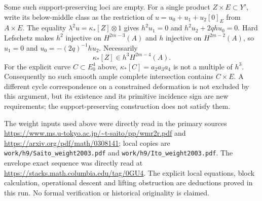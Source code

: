 Some such support-preserving loci are empty. For a single product
$Z\times E\subset Y'$, write its below-middle class as the
restriction of $u=u_0+u_1+u_2[0]_E$ from $A\times E$.
The equality $\lambda^2u=\kappa_*[Z]\otimes1$ gives
$h^2u_1=0$ and $h^2u_2+2qh u_0=0$. Hard Lefschetz makes
$h^2$ injective on $H^{2m-3}(A)$ and $h$ injective on
$H^{2m-2}(A)$, so $u_1=0$ and
$u_0=-(2q)^{-1}hu_2$. Necessarily
\[
                     \kappa_*[Z]\in h^3H^{2m-4}(A).
\]
For the explicit curve $C\subset E_0^4$ above,
$\kappa_*[C]=a_2a_3a_4$ is not a multiple of $h^3$.
Consequently no such smooth ample complete intersection contains
$C\times E$. A different cycle correspondence on a constrained
deformation is not excluded by this argument, but its existence
and its primitive incidence sign are new requirements; the
support-preserving construction does not satisfy them.

The weight inputs used above were directly read in the primary
sources
\url{https://www.ms.u-tokyo.ac.jp/~t-saito/pp/wmr2r.pdf} and
\url{https://arxiv.org/pdf/math/0308141}; local copies are
\texttt{work/h9/Saito\_weight2003.pdf} and
\texttt{work/h9/Ito\_weight2003.pdf}.
The envelope exact sequence was directly read at
\url{https://stacks.math.columbia.edu/tag/0GU4}.
The explicit local equations, block calculation, operational descent
and lifting obstruction are deductions proved in this run.
No formal verification or historical originality is claimed.
